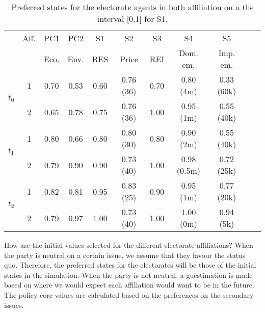 
\begin{table}
\begin{center}
\begin{tabular}{ |c|c|c|c|c|c|c|c|c|c|c| } 
\hline
			& Aff. 	& PC1 	& PC2	& S1		& S2			& S3		& S4			& S5		\\ 
			&		& Eco.	& Env.	& RES	& Price		& REI	& Dom. em.	& Imp. em.\\ \hline \hline

\multirow{2}{*}{$t_0$}
			& 1		& 0.70	& 0.53	& 0.60	& 0.76 (36)	& 0.70	& 0.80 (4m)	& 0.33 (60k)	\\ \cline{2-9}
			& 2		& 0.65	& 0.78	& 0.75	& 0.76 (36) 	& 1.00	& 0.95 (1m)	& 0.55 (40k)	\\ \hline \hline
					
\multirow{2}{*}{$t_1$}
			& 1		& 0.80	& 0.66	& 0.80	& 0.80 (30)	& 0.80	& 0.90 (2m)	& 0.55 (40k)	\\ \cline{2-9}
			& 2		& 0.79	& 0.90	& 0.90	& 0.73 (40)	& 1.00	& 0.98 (0.5m)	& 0.72 (25k)	\\ \hline \hline
					
\multirow{2}{*}{$t_2$}
			&1		& 0.82	& 0.81	& 0.95	& 0.83 (25)	& 0.90	& 0.95 (1m)	& 0.77 (20k)	\\ \cline{2-9}
			& 2		& 0.79	& 0.97 	& 1.00	& 0.73 (40)	& 1.00	& 1.00 (0m)	& 0.94 (5k)	\\
\hline
\end{tabular}
\end{center}
\caption{Preferred states for the electorate agents in both affiliation on a the interval [0,1] for S1.}
\label{tab:preferredStates_Elec_S1}
\end{table}

How are the initial values selected for the different electorate affiliations? When the party is neutral on a certain issue, we assume that they favour the status quo. Therefore, the preferred states for the electorates will be those of the initial states in the simulation. When the party is not neutral, a guestimation is made based on where we would expect each affiliation would want to be in the future. The policy core values are calculated based on the preferences on the secondary issues.

